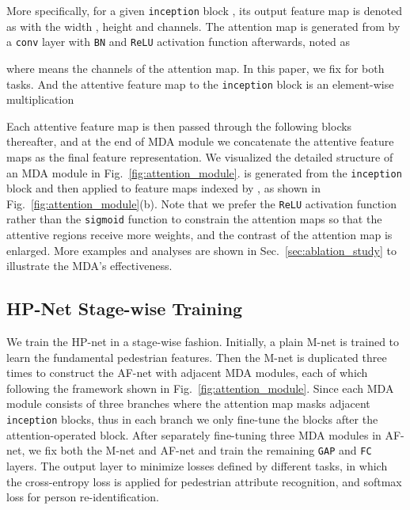 \documentclass[10pt,twocolumn,letterpaper]{article}
\begin{document}
More specifically, for a given \texttt{inception} block , its output feature map is denoted as  with the width , height  and  channels.
The attention map  is generated from  by a  \texttt{conv} layer with \texttt{BN} and \texttt{ReLU} activation function afterwards, noted as

where  means the channels of the attention map.
In this paper, we fix  for both tasks.
And the attentive feature map to the \texttt{inception} block  is an element-wise multiplication

Each attentive feature map  is then passed through the following blocks thereafter, and at the end of MDA module we concatenate the  attentive feature maps as the final feature representation.
We visualized the detailed structure of an MDA module  in Fig.~\ref{fig:attention_module}.
 is generated from the \texttt{inception} block  and then applied to feature maps indexed by , as shown in Fig.~\ref{fig:attention_module}(b).
Note that we prefer the \texttt{ReLU} activation function rather than the \texttt{sigmoid} function to constrain the attention maps so that the attentive regions receive more weights, and the contrast of the attention map is enlarged.
More examples and analyses are shown in Sec.~\ref{sec:ablation_study} to illustrate the MDA's effectiveness.



\subsection{HP-Net Stage-wise Training}
\label{subsec:stage_wise_training}

We train the HP-net in a stage-wise fashion.
Initially, a plain M-net is trained to learn the fundamental pedestrian features.
Then the M-net is duplicated three times to construct the AF-net with adjacent MDA modules, each of which following the framework shown in Fig.~\ref{fig:attention_module}.
Since each MDA module consists of three branches where the attention map masks adjacent \texttt{inception} blocks, thus in each branch we only fine-tune the blocks after the attention-operated block.
After separately fine-tuning three MDA modules in AF-net, we fix both the M-net and AF-net and train the remaining \texttt{GAP} and \texttt{FC} layers.
The output layer to minimize losses defined by different tasks, in which the cross-entropy loss  is applied for pedestrian attribute recognition, and softmax loss for person re-identification.
\end{document}
